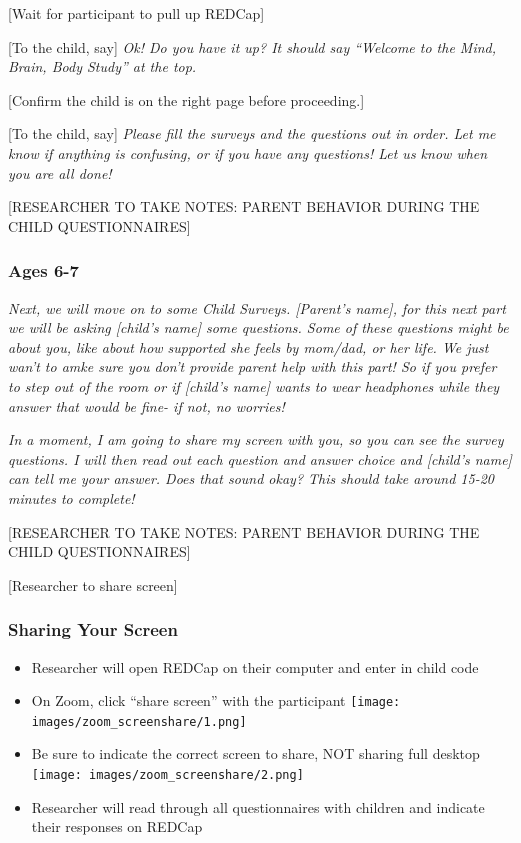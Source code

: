\documentclass[
]{book}
\providecommand{\tightlist}{%
  \setlength{\itemsep}{0pt}\setlength{\parskip}{0pt}}
\begin{document}
{[}Wait for participant to pull up REDCap{]}

{[}To the child, say{]} \emph{Ok! Do you have it up? It should say ``Welcome to the Mind, Brain, Body Study'' at the top.}

{[}Confirm the child is on the right page before proceeding.{]}

{[}To the child, say{]} \emph{Please fill the surveys and the questions out in order. Let me know if anything is confusing, or if you have any questions! Let us know when you are all done!}

{[}RESEARCHER TO TAKE NOTES: PARENT BEHAVIOR DURING THE CHILD QUESTIONNAIRES{]}

\hypertarget{ages-6-7}{%
\subsubsection{Ages 6-7}\label{ages-6-7}}

\emph{Next, we will move on to some Child Surveys. {[}Parent's name{]}, for this next part we will be asking {[}child's name{]} some questions. Some of these questions might be about you, like about how supported she feels by mom/dad, or her life. We just wan't to amke sure you don't provide parent help with this part! So if you prefer to step out of the room or if {[}child's name{]} wants to wear headphones while they answer that would be fine- if not, no worries!}

\emph{In a moment, I am going to share my screen with you, so you can see the survey questions. I will then read out each question and answer choice and {[}child's name{]} can tell me your answer. Does that sound okay? This should take around 15-20 minutes to complete!}

{[}RESEARCHER TO TAKE NOTES: PARENT BEHAVIOR DURING THE CHILD QUESTIONNAIRES{]}

{[}Researcher to share screen{]}

\hypertarget{sharing-your-screen}{%
\subsubsection{Sharing Your Screen}\label{sharing-your-screen}}

\begin{itemize}
\tightlist
\item
  Researcher will open REDCap on their computer and enter in child code
\item
  On Zoom, click ``share screen'' with the participant \texttt{[image: images/zoom\_screenshare/1.png]}
\item
  Be sure to indicate the correct screen to share, NOT sharing full desktop \texttt{[image: images/zoom\_screenshare/2.png]}
\item
  Researcher will read through all questionnaires with children and indicate their responses on REDCap
\end{itemize}
\end{document}
